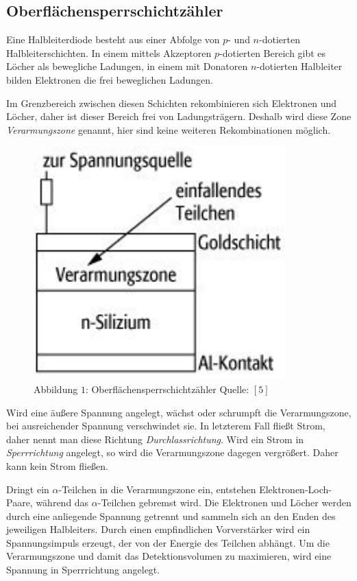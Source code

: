 \documentclass[12pt,a4paper]{scrartcl}
\numberwithin{equation}{section} %
\renewcommand{\[}{} %
\renewcommand{\]}{\noindent} %
\begin{document}
\hypertarget{oberfluxe4chensperrschichtzuxe4hler}{%
\subsection{Oberflächensperrschichtzähler}\label{oberfluxe4chensperrschichtzuxe4hler}}

Eine Halbleiterdiode besteht aus einer Abfolge von \(p\)- und
\(n\)-dotierten Halbleiterschichten. In einem mittels Akzeptoren
\(p\)-dotierten Bereich gibt es Löcher als bewegliche Ladungen, in einem
mit Donatoren \(n\)-dotierten Halbleiter bilden Elektronen die frei
beweglichen Ladungen.

Im Grenzbereich zwischen diesen Schichten rekombinieren sich Elektronen
und Löcher, daher ist dieser Bereich frei von Ladungsträgern. Deshalb
wird diese Zone \emph{Verarmungszone} genannt, hier sind keine weiteren
Rekombinationen möglich.

\begin{figure}
	\centering
	\includegraphics{../media/B3.3/Oberflaechensperrschichtzaehler.pdf}
	\caption{Abbildung \(1\): Oberflächensperrschichtzähler Quelle: \([5]\)}
\end{figure}

Wird eine äußere Spannung angelegt, wächst oder schrumpft die
Verarmungszone, bei ausreichender Spannung verschwindet sie. In
letzterem Fall fließt Strom, daher nennt man diese Richtung
\emph{Durchlassrichtung}. Wird ein Strom in \emph{Sperrrichtung}
angelegt, so wird die Verarmungszone dagegen vergrößert. Daher kann kein
Strom fließen.

Dringt ein \(\alpha\)-Teilchen in die Verarmungszone ein, entstehen
Elektronen-Loch-Paare, während das \(\alpha\)-Teilchen gebremst wird.
Die Elektronen und Löcher werden durch eine anliegende Spannung getrennt
und sammeln sich an den Enden des jeweiligen Halbleiters. Durch einen
empfindlichen Vorverstärker wird ein Spannungsimpuls erzeugt, der von
der Energie des Teilchen abhängt. Um die Verarmungszone und damit das
Detektionsvolumen zu maximieren, wird eine Spannung in Sperrrichtung
angelegt.
\end{document}
